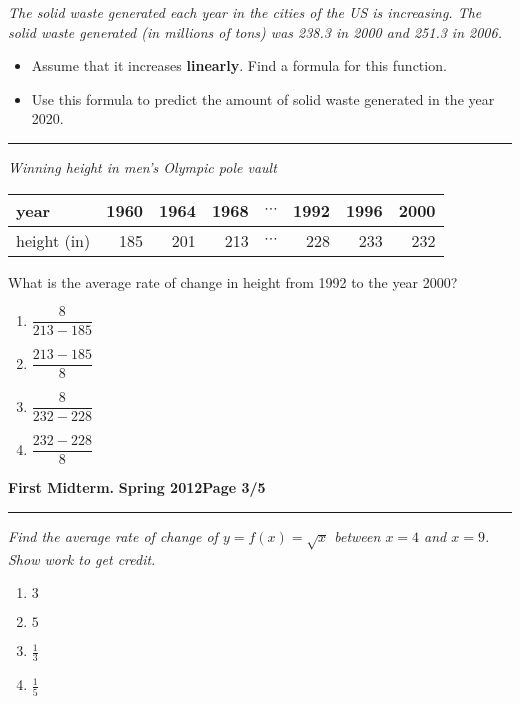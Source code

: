 \documentclass[12pt]{article}
\begin{document}
\bigskip
{\problem[10 pts] \em The solid waste generated each year in the
  cities of the US is increasing.  The solid waste generated (in
  millions of tons) was 238.3 in 2000 and 251.3 in 2006.}
\begin{itemize}
\item Assume that it increases {\bf linearly}. Find a formula for
  this function.
\vspace{3.5cm}
\begin{flushright}
\end{flushright}
\item Use this formula to predict the amount of solid waste generated
  in the year 2020.
\vspace{3.5cm}
\begin{flushright}
\end{flushright}
\end{itemize}
\hrule
{\problem[10 pts] \em Winning height in men's Olympic pole vault}
\begin{center}
\begin{tabular}{l|r|r|r|c|r|r|r|}
\hline
year & 1960 & 1964 & 1968 & $\cdots$ & 1992 & 1996 & 2000 \\
\hline
height (in) & 185 & 201 & 213 & $\cdots$ & 228 & 233 & 232 \\
\hline
\end{tabular}
\end{center}
What is the average rate of change in height from 1992 to the year 2000?
\begin{enumerate}
\item $\dfrac{8}{213-185}$
\item $\dfrac{213-185}{8}$
\item $\dfrac{8}{232-228}$
\item $\dfrac{232-228}{8}$
\end{enumerate}
\newpage

\hfill{\large\bf First Midterm.}\hfill{\large\bf
  Spring 2012}\hfill{\large\bf Page 3/5}\hrule

\bigskip
{\problem[10 pts] \em Find the average rate of change of $y=f(x) =
  \sqrt{x}$ between $x=4$ and $x=9$.  Show work to get credit.}
\begin{enumerate}
\item $3$
\item $5$
\item $\tfrac{1}{3}$
\item $\tfrac{1}{5}$
\end{enumerate}
\end{document}

